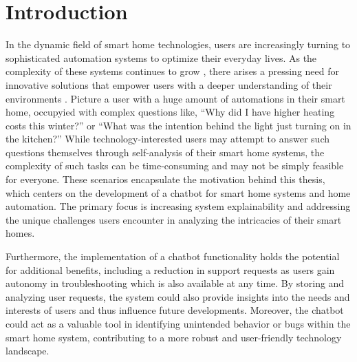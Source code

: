 \chapter{Introduction}

In the dynamic field of smart home technologies, users are increasingly turning to sophisticated automation systems to optimize their everyday lives.
As the complexity of these systems continues to grow \cite{technologies11010009}, there arises a pressing need for innovative solutions that empower users with a deeper understanding of their environments \cite{baby_home_2017}. 
Picture a user with a huge amount of automations in their smart home, occupyied with complex questions like, ``Why did I have higher heating costs this winter?'' or ``What was the intention behind the light just turning on in the kitchen?''
While technology-interested users may attempt to answer such questions themselves through self-analysis of their smart home systems, the complexity of such tasks can be time-consuming and may not be simply feasible for everyone.
These scenarios encapsulate the motivation behind this thesis, which centers on the development of a chatbot for smart home systems and home automation.
The primary focus is increasing system explainability and addressing the unique challenges users encounter in analyzing the intricacies of their smart homes.

Furthermore, the implementation of a chatbot functionality holds the potential for additional benefits, including a reduction in support requests as users gain autonomy in troubleshooting \cite{HUANG2024103600} which is also available at any time. 
By storing and analyzing user requests, the system could also provide insights into the needs and interests of users and thus influence future developments. 
Moreover, the chatbot could act as a valuable tool in identifying unintended behavior or bugs within the smart home system, contributing to a more robust and user-friendly technology landscape.


